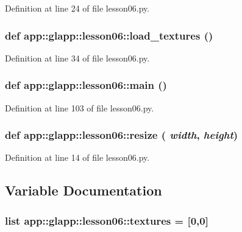 Definition at line 24 of file lesson06.py.
\subsubsection{\setlength{\rightskip}{0pt plus 5cm}def app::glapp::lesson06::load\_\-textures ()}\label{namespaceapp_1_1glapp_1_1lesson06_8660e53c4f21c7631ffcdb66ffc2b86b}




Definition at line 34 of file lesson06.py.
\subsubsection{\setlength{\rightskip}{0pt plus 5cm}def app::glapp::lesson06::main ()}\label{namespaceapp_1_1glapp_1_1lesson06_b38a70dc6514cf25e91396999f136fb2}




Definition at line 103 of file lesson06.py.
\subsubsection{\setlength{\rightskip}{0pt plus 5cm}def app::glapp::lesson06::resize ( {\em width},  {\em height})}\label{namespaceapp_1_1glapp_1_1lesson06_5b4b6ef4911d481fdbe11e6b674c9f37}




Definition at line 14 of file lesson06.py.

\subsection{Variable Documentation}
\subsubsection{\setlength{\rightskip}{0pt plus 5cm}list {\bf app::glapp::lesson06::textures} = [0,0]\hspace{0.3cm}{\tt  [static]}}\label{namespaceapp_1_1glapp_1_1lesson06_09917fd6bff0f60aa901fe3bf834fb6a}




